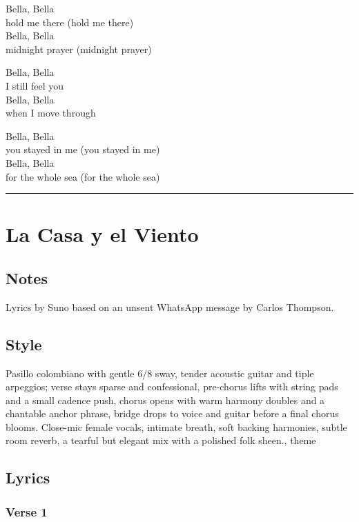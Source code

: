 Bella, Bella\\
hold me there (hold me there)\\
Bella, Bella\\
midnight prayer (midnight prayer)

Bella, Bella\\
I still feel you\\
Bella, Bella\\
when I move through

Bella, Bella\\
you stayed in me (you stayed in me)\\
Bella, Bella\\
for the whole sea (for the whole sea)

\begin{center}\rule{0.5\linewidth}{0.5pt}\end{center}

\section{La Casa y el Viento}\label{la-casa-y-el-viento}

\subsection{Notes}\label{notes-27}

Lyrics by Suno based on an unsent WhatsApp message by Carlos Thompson.

\subsection{Style}\label{style-26}

Pasillo colombiano with gentle 6/8 sway, tender acoustic guitar and
tiple arpeggios; verse stays sparse and confessional, pre-chorus lifts
with string pads and a small cadence push, chorus opens with warm
harmony doubles and a chantable anchor phrase, bridge drops to voice and
guitar before a final chorus blooms. Close-mic female vocals, intimate
breath, soft backing harmonies, subtle room reverb, a tearful but
elegant mix with a polished folk sheen., theme

\subsection{Lyrics}\label{lyrics-26}

\subsubsection{Verse 1}\label{verse-1-22}


